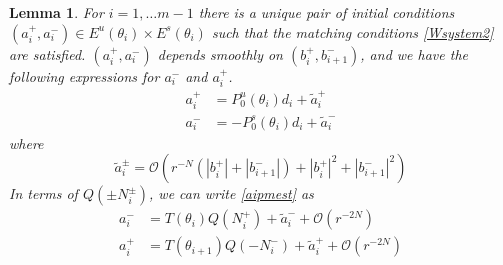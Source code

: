 \documentclass[12pt]{article}
\newtheorem{lemma}{Lemma}
\begin{document}
\begin{lemma}\label{inv2}
For $i = 1, \dots m-1$ there is a unique pair of initial conditions $(a_i^+, a_i^-) \in E^u(\theta_i) \times E^s(
\theta_i)$ such that the matching conditions \eqref{Wsystem2} are satisfied. $(a_i^+, a_i^-)$ depends smoothly on $(b_i^+, b_{i+1}^-)$, and we have the following expressions for $a_i^-$ and $a_i^+$. 
\begin{equation}\label{aipmest}
\begin{aligned}
a_i^+ &= P_0^u(\theta_i) d_i + \tilde{a}_i^+ \\
a_i^- &= -P_0^s(\theta_i) d_i + \tilde{a}_i^-
\end{aligned}
\end{equation}
where 
\begin{equation}\label{tildeaest}
\tilde{a}_i^\pm = \mathcal{O}(r^{-N}(|b_i^+|+|b_{i+1}^-|) + |b_i^+|^2+|b_{i+1}^-|^2) 
\end{equation}
In terms of $Q(\pm N_i^\pm)$, we can write \eqref{aipmest} as 
\begin{equation}\label{aipmexp}
\begin{aligned}
a_i^- &= T(\theta_i) Q(N_i^+) + \tilde{a}_i^- + \mathcal{O}(r^{-2N}) \\
a_i^+ &= T(\theta_{i+1}) Q(-N_i^-) + \tilde{a}_i^+ + \mathcal{O}(r^{-2N})
\end{aligned}
\end{equation}


\end{lemma}
\end{document}
